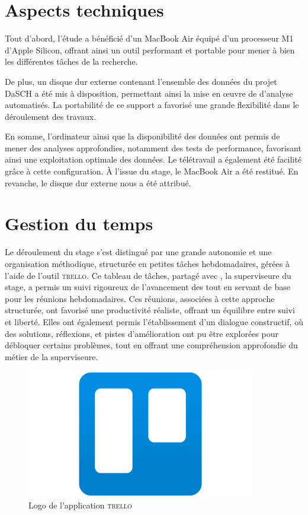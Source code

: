     \section{Aspects techniques}
    Tout d'abord, l'étude a bénéficié d'un MacBook Air équipé d'un processeur M1 d'Apple Silicon, offrant ainsi un outil performant et portable pour mener à bien les différentes tâches de la recherche.
    
    De plus, un disque dur externe contenant l'ensemble des données du projet DaSCH a été mis à disposition, permettant ainsi la mise en œuvre de  d'analyse automatisés. La portabilité de ce support a favorisé une grande flexibilité dans le déroulement des travaux.

    En somme, l'ordinateur ainsi que la disponibilité des données ont permis de mener des analyses approfondies, notamment des tests de performance, favorisant ainsi une exploitation optimale des données. Le télétravail a également été facilité grâce à cette configuration. À l'issue du stage, le MacBook Air a été restitué. En revanche, le disque dur externe nous a été attribué.

    \section{Gestion du temps}    
    Le déroulement du stage s’est distingué par une grande autonomie et une organisation méthodique, structurée en petites tâches hebdomadaires, gérées à l’aide de l’outil \textsc{trello}. Ce tableau de tâches, partagé avec \rg, la superviseure du stage, a permis un suivi rigoureux de l’avancement des  tout en servant de base pour les réunions hebdomadaires. Ces réunions, associées à cette approche structurée, ont favorisé une productivité réaliste, offrant un équilibre entre suivi et liberté. Elles ont également permis l’établissement d’un dialogue constructif, où des solutions, réflexions, et pistes d’amélioration ont pu être explorées pour débloquer certains problèmes, tout en offrant une compréhension approfondie du métier de la superviseure.

        \begin{figure}[h!]
            \centering
            \includegraphics[width=10cm]{02_images/part_03/01_trello_logo.png}
            \caption{Logo de l'application \textsc{trello}}
        \end{figure}
    
